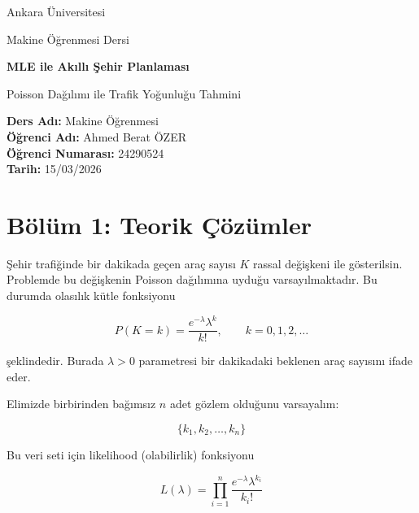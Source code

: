 \documentclass[12pt,a4paper]{article}
\begin{document}
\begin{titlepage}
    \centering
    \vspace*{3cm}

    {\Large Ankara Üniversitesi \par}
    \vspace{0.5cm}
    {\Large Makine Öğrenmesi Dersi \par}
    \vspace{2cm}

    {\Huge \textbf{MLE ile Akıllı Şehir Planlaması} \par}
    \vspace{0.5cm}
    {\Large Poisson Dağılımı ile Trafik Yoğunluğu Tahmini \par}

    \vfill

    \begin{flushleft}
    \textbf{Ders Adı:} Makine Öğrenmesi \\
    \textbf{Öğrenci Adı:} Ahmed Berat ÖZER \\
    \textbf{Öğrenci Numarası:} 24290524 \\
    \textbf{Tarih:} 15/03/2026
    \end{flushleft}

    \vfill
\end{titlepage}

\section*{Bölüm 1: Teorik Çözümler}

Şehir trafiğinde bir dakikada geçen araç sayısı \(K\) rassal değişkeni ile gösterilsin. Problemde bu değişkenin Poisson dağılımına uyduğu varsayılmaktadır. Bu durumda olasılık kütle fonksiyonu

\[
P(K=k)=\frac{e^{-\lambda}\lambda^k}{k!}, \qquad k=0,1,2,\dots
\]

şeklindedir. Burada \(\lambda > 0\) parametresi bir dakikadaki beklenen araç sayısını ifade eder.

Elimizde birbirinden bağımsız \(n\) adet gözlem olduğunu varsayalım:

\[
\{k_1,k_2,\dots,k_n\}
\]

Bu veri seti için likelihood (olabilirlik) fonksiyonu

\[
L(\lambda)=\prod_{i=1}^{n}\frac{e^{-\lambda}\lambda^{k_i}}{k_i!}
\]
\end{document}
